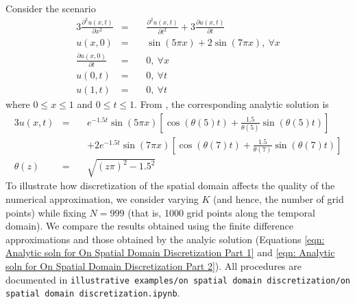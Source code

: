 \documentclass{article}
\begin{document}
Consider the scenario
\begin{alignat}{3}
   \label{eqn: Telegraph eqn for On Spatial Domain Discretization}
   \frac{\partial^{2} u \left(x,t\right)}{\partial x^{2}} &=\ && \frac{\partial^{2} u \left(x,t\right)}{\partial t^{2}} + 3 \frac{\partial u \left(x,t\right)}{\partial t} \\
   \label{eqn: mu for On Spatial Domain Discretization}
   u \left(x,0\right) &=\ && \sin \left(5 \pi x\right) + 2 \sin \left(7 \pi x\right),\ \forall x \\
   \label{eqn: xi for On Spatial Domain Discretization}
   \frac{\partial u \left(x,0\right)}{\partial t} &=\ && 0,\ \forall x \\
   \label{eqn: nu_0 for On Spatial Domain Discretization}
   u \left(0,t\right) &=\ && 0,\ \forall t \\
   \label{eqn: nu_X for On Spatial Domain Discretization}
   u \left(1,t\right) &=\ && 0,\ \forall t
\end{alignat}
where $0 \leq x \leq 1$ and $0 \leq t \leq 1$.
From \cite{Zhang2019}, the corresponding analytic solution is
\begin{alignat}{3}
   \label{eqn: Analytic soln for On Spatial Domain Discretization Part 1}
   u \left(x,t\right) &=\ && e^{-1.5t}
   \sin\left(5 \pi x\right) \left[\cos\left(\theta\left(5\right)t\right) + \frac{1.5}{\theta\left(5\right)} \sin \left(\theta\left(5\right)t\right)\right] \nonumber \\
   & &&+ 2e^{-1.5t} \sin\left(7 \pi x\right) \left[\cos\left(\theta\left(7\right)t\right) + \frac{1.5}{\theta\left(7\right)} \sin \left(\theta\left(7\right)t\right)\right] \\
   \label{eqn: Analytic soln for On Spatial Domain Discretization Part 2}
   \theta \left(z\right) &=\ && \sqrt{\left(z \pi\right)^{2} - 1.5^{2}}
\end{alignat}
To illustrate how discretization of the spatial domain affects the quality of the numerical approximation,
we consider varying $K$ (and hence, the number of grid points)
while fixing $N=999$ (that is, 1000 grid points along the temporal domain).
We compare the results obtained using the finite difference approximations
and those obtained by the analyic solution
(Equations \ref{eqn: Analytic soln for On Spatial Domain Discretization Part 1} and \ref{eqn: Analytic soln for On Spatial Domain Discretization Part 2}).
All procedures are documented in
{\tt illustrative examples/on spatial domain discretization/on spatial domain discretization.ipynb}.
\end{document}
